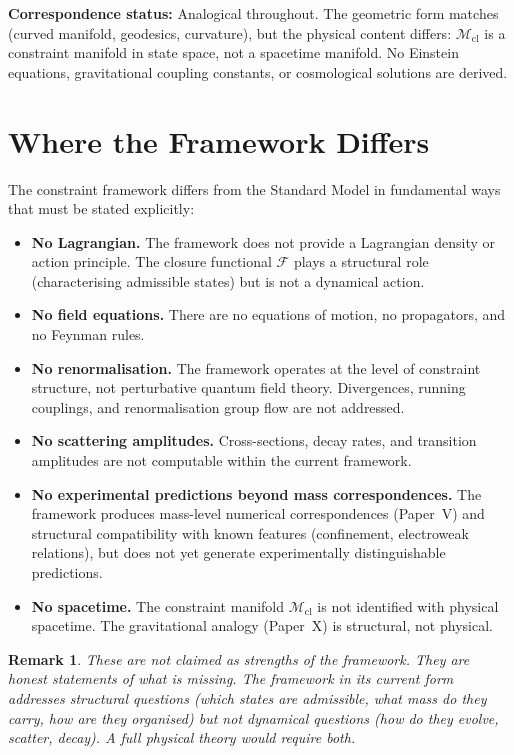 \documentclass[12pt]{article}
\newtheorem{remark}{Remark}
\newcommand{\Mcl}{\mathcal{M}_{\mathrm{cl}}}
\newcommand{\Fcal}{\mathcal{F}}
\begin{document}
\textbf{Correspondence status:} Analogical throughout. The geometric form matches (curved manifold, geodesics, curvature), but the physical content differs: $\Mcl$ is a constraint manifold in state space, not a spacetime manifold. No Einstein equations, gravitational coupling constants, or cosmological solutions are derived.

\section{Where the Framework Differs}\label{sec:differs}

The constraint framework differs from the Standard Model in fundamental ways that must be stated explicitly:

\begin{itemize}
    \item \textbf{No Lagrangian.} The framework does not provide a Lagrangian density or action principle. The closure functional $\Fcal$ plays a structural role (characterising admissible states) but is not a dynamical action.
    \item \textbf{No field equations.} There are no equations of motion, no propagators, and no Feynman rules.
    \item \textbf{No renormalisation.} The framework operates at the level of constraint structure, not perturbative quantum field theory. Divergences, running couplings, and renormalisation group flow are not addressed.
    \item \textbf{No scattering amplitudes.} Cross-sections, decay rates, and transition amplitudes are not computable within the current framework.
    \item \textbf{No experimental predictions beyond mass correspondences.} The framework produces mass-level numerical correspondences (Paper~V) and structural compatibility with known features (confinement, electroweak relations), but does not yet generate experimentally distinguishable predictions.
    \item \textbf{No spacetime.} The constraint manifold $\Mcl$ is not identified with physical spacetime. The gravitational analogy (Paper~X) is structural, not physical.
\end{itemize}

\begin{remark}
These are not claimed as strengths of the framework. They are honest statements of what is missing. The framework in its current form addresses \textit{structural} questions (which states are admissible, what mass do they carry, how are they organised) but not \textit{dynamical} questions (how do they evolve, scatter, decay). A full physical theory would require both.
\end{remark}
\end{document}
